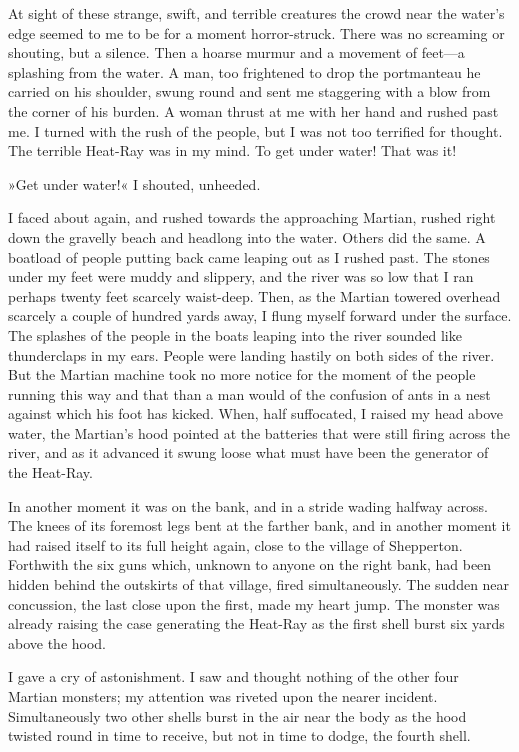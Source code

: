 At sight of these strange, swift, and terrible creatures the crowd near the water's edge seemed to me to be for a moment horror-struck. There was no screaming or shouting, but a silence. Then a hoarse murmur and a movement of feet—a splashing from the water. A man, too frightened to drop the portmanteau he carried on his shoulder, swung round and sent me staggering with a blow from the corner of his burden. A woman thrust at me with her hand and rushed past me. I turned with the rush of the people, but I was not too terrified for thought. The terrible Heat-Ray was in my mind. To get under water! That was it!

»Get under water!« I shouted, unheeded.

I faced about again, and rushed towards the approaching Martian, rushed right down the gravelly beach and headlong into the water. Others did the same. A boatload of people putting back came leaping out as I rushed past. The stones under my feet were muddy and slippery, and the river was so low that I ran perhaps twenty feet scarcely waist-deep. Then, as the Martian towered overhead scarcely a couple of hundred yards away, I flung myself forward under the surface. The splashes of the people in the boats leaping into the river sounded like thunderclaps in my ears. People were landing hastily on both sides of the river. But the Martian machine took no more notice for the moment of the people running this way and that than a man would of the confusion of ants in a nest against which his foot has kicked. When, half suffocated, I raised my head above water, the Martian's hood pointed at the batteries that were still firing across the river, and as it advanced it swung loose what must have been the generator of the Heat-Ray.

In another moment it was on the bank, and in a stride wading halfway across. The knees of its foremost legs bent at the farther bank, and in another moment it had raised itself to its full height again, close to the village of Shepperton. Forthwith the six guns which, unknown to anyone on the right bank, had been hidden behind the outskirts of that village, fired simultaneously. The sudden near concussion, the last close upon the first, made my heart jump. The monster was already raising the case generating the Heat-Ray as the first shell burst six yards above the hood.

I gave a cry of astonishment. I saw and thought nothing of the other four Martian monsters; my attention was riveted upon the nearer incident. Simultaneously two other shells burst in the air near the body as the hood twisted round in time to receive, but not in time to dodge, the fourth shell.


